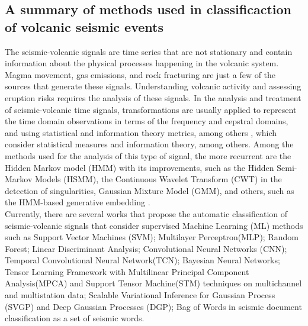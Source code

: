 \documentclass[journal]{IEEEtran}
\begin{document}
\subsection{A summary of methods used in classificaction of volcanic seismic events}
The seismic-volcanic signals are time series that are not stationary and contain information about the physical processes happening in the volcanic system. Magma movement, gas emissions, and rock fracturing are just a few of the sources that generate these signals. Understanding volcanic activity and assessing eruption risks requires the analysis of these signals.
In the analysis and treatment of seismic-volcanic time signals, transformations are usually applied to represent the time domain observations in terms of the frequency and cepstral domains, and using statistical and information theory metrics, among others \cite{malfante2018automatic,lara2020automatic}, which consider statistical measures and information theory, among others. Among the methods used for the analysis of this type of signal, the more recurrent are the Hidden Markov model (HMM)\cite{bicego2012classification,beyreuther2012constructing, carniel2014characterization} with its improvements, such as the Hidden Semi-Markov Models (HSMM), the Continuous Wavelet Transform (CWT)\cite{beyreuther2012constructing} in the detection of singularities, Gaussian Mixture Model (GMM)\cite{langer2009synopsis}, and others, such as the HMM-based generative embedding \cite{bicego2012classification}. \\
Currently, there are several works that propose the automatic classification of seismic-volcanic signals that consider supervised Machine Learning (ML) methods such as Support Vector Machines (SVM)\cite{malfante2018automatic,curilem2016pattern,giacco2009support,langer2009synopsis,lara2020automatic,curilem2018improving,malfante2018machine}; Multilayer Perceptron(MLP)\cite{giacco2009support,langer2009synopsis,lara2020automatic}; Random Forest\cite{malfante2018automatic,lara2020automatic,titos2019classification}; Linear Discriminant Analysis\cite{lara2020automatic}; Convolutional Neural Networks (CNN)\cite{titos2019classification,salazar2020deep,curilem2018using}; Temporal Convolutional Neural Network(TCN)\cite{titos2019classification,rodriguez2021bayesian}; Bayesian Neural Networks\cite{bueno2019volcano}; Tensor Learning Framework with Multilinear Principal Component Analysis(MPCA) and Support Tensor Machine(STM)\cite{peixoto2021tensor} techniques on multichannel and multistation data; Scalable Variational Inference for Gaussian Process (SVGP) and Deep Gaussian Processes (DGP)\cite{lopez2020acontribution}; Bag of Words in seismic document classification as a set of seismic words\cite{bicego2015volcano}. \\
\end{document}
